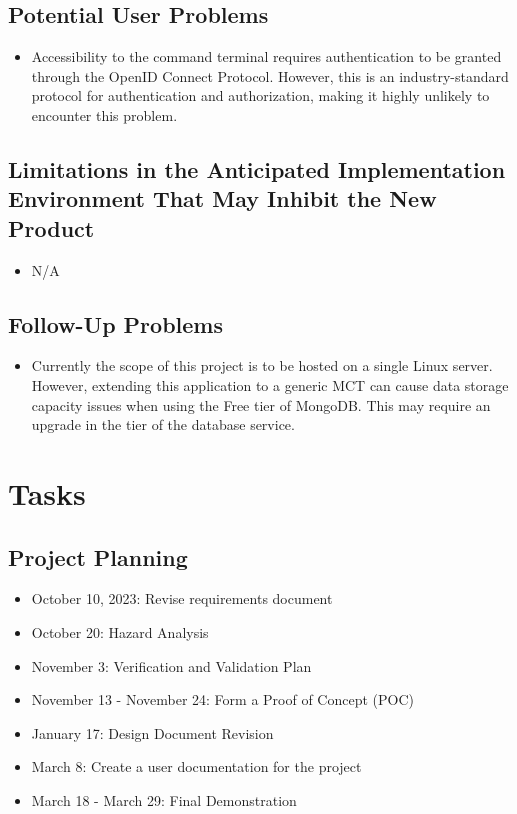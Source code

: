 \documentclass[12pt]{article}
\begin{document}
\subsection{Potential User Problems}
\begin{itemize}
    \item Accessibility to the command terminal requires authentication to be granted through the OpenID Connect Protocol. However, this is an industry-standard protocol for authentication and authorization, making it highly unlikely to encounter this problem.
\end{itemize}

\subsection{Limitations in the Anticipated Implementation Environment That May
Inhibit the New Product}
\begin{itemize}
    \item N/A
\end{itemize}

\subsection{Follow-Up Problems}
\begin{itemize}
    \item Currently the scope of this project is to be hosted on a single Linux server. However, extending this application to a generic MCT can cause data storage capacity issues when using the Free tier of MongoDB. This may require an upgrade in the tier of the database service.
\end{itemize}

\section{Tasks}
\subsection{Project Planning}
\begin{itemize}
    \item October 10, 2023: Revise requirements document
    \item October 20: Hazard Analysis
    \item November 3: Verification and Validation Plan
    \item November 13 - November 24: Form a Proof of Concept (POC)
    \item January 17: Design Document Revision
    \item March 8: Create a user documentation for the project
    \item March 18 - March 29: Final Demonstration 
\end{itemize}
\end{document}
